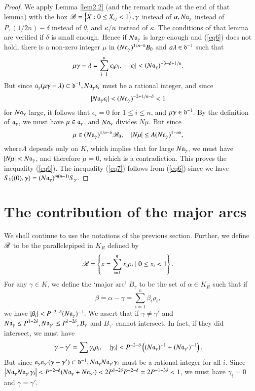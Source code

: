 \begin{proof}
We apply Lemma \ref{lem2.2} (and the remark made at the end of that 
lemma) with the box $\mathscr{B}=\left\{{X:0\leq X_{ij}<1}\right\},\gamma$ instead of 
$\alpha, N\mathfrak{a}_\gamma$ instead of $P,(1/2n)-\delta$ instead of 
$\theta$, and $\kappa/n$ instead of $\kappa$. The conditions of that 
lemma are verified if $\delta$ is small enough. Hence if $N\mathfrak{a}_\gamma$ 
is large enough and (\ref{eq6}) does not hold, there is a non-zero 
integer $\mu$ in $(N\mathfrak{a}_\gamma)^{1/n-\mathfrak{d}}B_0$ and $a\lambda\in 
\mathfrak{d}^{-1}$ such that 
$$
\mu\gamma-\lambda=\sum\limits_{i=1}^n\epsilon_i\rho_i,\quad 
|\epsilon_i|<(N\mathfrak{a}_\gamma)^{-3-\delta+1/n}.
$$
But since $\mathfrak{a}_\gamma(\mu\gamma-\lambda)\subset\mathfrak{d}^{-1}, 
N\mathfrak{a}_\gamma \epsilon_i$ must be a rational integer, and since
$$
|N\mathfrak{a}_\gamma\epsilon_i|<(N\mathfrak{a}_\gamma)^{-2+1/n-\delta}<1
$$
for $N\mathfrak{a}_\gamma$ large, it follows that $\epsilon_i=0$ for $1\leq 
i\leq n$, and $\mu\gamma\in\mathfrak{d}^{-1}$. By the definition of 
$\mathfrak{a}_\gamma$, we must have $\mu\in\mathfrak{a}_\gamma$, and $N\mathfrak{a}_\gamma$ 
divides $N\mu$. But since 
$$
\mu\in(N\mathfrak{a}_\gamma)^{1/n-\delta}\mathscr{B}_0,\quad |N\mu|\leq A 
(N\mathfrak{a}_\gamma)^{1-n\delta},
$$
where\pageoriginale $A$ depends only on $K$, which implies that for 
large $N\mathfrak{a}_\gamma$, we must have $|N\mu|<N\mathfrak{a}_\gamma$, and therefore 
$\mu=0$, which is a contradiction. This proves the inequality 
(\ref{eq6}). The inequality (\ref{eq7}) follows from (\ref{eq6}) since 
we have $S_1((0),\gamma)=(N\mathfrak{a}_\gamma)^{m(n-1)}S_\gamma$.
\end{proof}

\section{The contribution of the major arcs}\label{sec3}
We shall continue to use the notations of the previous section. 
Further, we define $\mathscr{R}$ to be the parallelepiped in $K_R$ defined by 
$$
\mathscr{R}=\left\{{x=\sum\limits_{i=1}^nx_i\rho_i\mid 0\leq x_i<1}\right\}.
$$
For any $\gamma\in K$, we define the `major arc' $B_\gamma$ to be the 
set of $\alpha\in K_R$ such that if 
$$
\beta=\alpha-\gamma=\sum\limits_{i=1}^n\beta_i\rho_i,
$$
we have $|\beta_i|<P^{-2-\delta}(N\mathfrak{a}_\gamma)^{-1}$. We assert that if 
$\gamma\neq\gamma'$ and $N\mathfrak{a}_\gamma\leq P^{1-2\delta}, N\mathfrak{a}_{\gamma'} 
\leq P^{1-2\delta}, B_\gamma$ and $B_{\gamma'}$ cannot intersect. In 
fact, if they did intersect, we must have 
$$
\gamma-\gamma'=\sum\gamma_i\rho_i,\quad |\gamma_i|<P^{-2-\delta} 
\left({(N\mathfrak{a}_\gamma)^{-1}+(N\mathfrak{a}_{\gamma'})^{-1}}\right).
$$
But since $\mathfrak{a}_\gamma\mathfrak{a}_{\gamma'}(\gamma-\gamma')\subset\mathfrak{d}^{-1}, 
N\mathfrak{a}_\gamma N\mathfrak{a}_{\gamma'}\gamma_i$ must be a rational integer for all 
$i$. Since $\left|{N\mathfrak{a}_\gamma N\mathfrak{a}_{\gamma'}\gamma_i}\right|<P^{-2-\delta} 
(N\mathfrak{a}_\gamma+N\mathfrak{a}_{\gamma'})<2P^{1-2\delta} P^{-2-\delta}=2 
P^{-1-3\delta}<1$, we must have $\gamma_i=0$ and $\gamma=\gamma'$.

